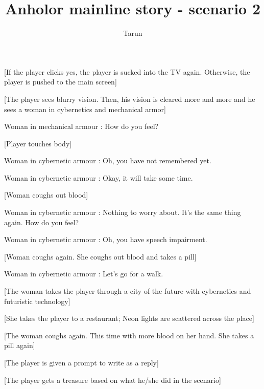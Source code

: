 \documentclass[a4paper,12pt]{article}
\author {Tarun}
\title {Anholor mainline story - scenario 2}
\begin{document}
\newline
[Continue?]\newline
[Yes/No?]\newline

[If the player clicks yes, the player is sucked into the TV again. Otherwise, the player is pushed to the main screen]\newline

[The player sees blurry vision. Then, his vision is cleared more and more and he sees a woman in cybernetics and mechanical armor]\newline

Woman in mechanical armour : How do you feel?\newline

[Player touches body]\newline

Woman in cybernetic armour : Oh, you have not remembered yet.\newline

Woman in cybernetic armour : Okay, it will take some time.\newline

[Woman coughs out blood]\newline

Woman in cybernetic armour : Nothing to worry about. It's the same thing again. How do you feel? \newline

Woman in cybernetic armour : Oh, you have speech impairment.\newline

[Woman coughs again. She coughs out blood and takes a pill]\newline

Woman in cybernetic armour : Let's go for a walk.\newline

[The woman takes the player through a city of the future with cybernetics and futuristic technology]\newline

[She takes the player to a restaurant; Neon lights are scattered across the place]\newline

[The woman coughs again. This time with more blood on her hand. She takes a pill again]\newline

[The player is given a prompt to write as a reply]\newline

[The player gets a treasure based on what he/she did in the scenario]\newline
\end{document}
